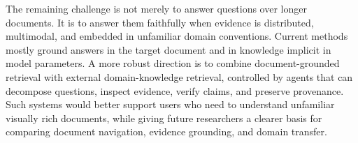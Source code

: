 \documentclass[10pt,a4paper]{article}
\begin{document}
The remaining challenge is not merely to answer questions over longer documents. It is to answer them faithfully when evidence is distributed, multimodal, and embedded in unfamiliar domain conventions. Current methods mostly ground answers in the target document and in knowledge implicit in model parameters. A more robust direction is to combine document-grounded retrieval with external domain-knowledge retrieval, controlled by agents that can decompose questions, inspect evidence, verify claims, and preserve provenance. Such systems would better support users who need to understand unfamiliar visually rich documents, while giving future researchers a clearer basis for comparing document navigation, evidence grounding, and domain transfer.



\end{document}
